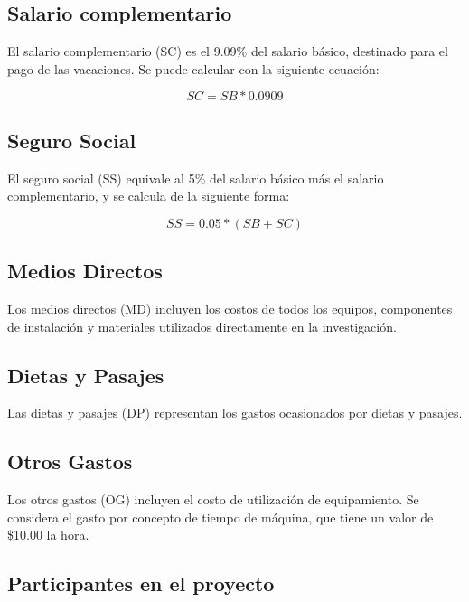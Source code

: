 \subsection{Salario complementario}

El salario complementario (SC) es el 9.09\% del salario básico, destinado para el pago de las vacaciones. Se puede calcular con la siguiente ecuación:

\begin{equation}
    \label{eq:salary_complementary}
    SC = SB * 0.0909
\end{equation}

\subsection{Seguro Social}

El seguro social (SS) equivale al 5\% del salario básico más el salario complementario, y se calcula de la siguiente forma:

\begin{equation}
    \label{eq:social_security}
    SS = 0.05 * (SB + SC)
\end{equation}

\subsection{Medios Directos}

Los medios directos (MD) incluyen los costos de todos los equipos, componentes de instalación y materiales utilizados directamente en la investigación.

\subsection{Dietas y Pasajes}

Las dietas y pasajes (DP) representan los gastos ocasionados por dietas y pasajes.

\subsection{Otros Gastos}

Los otros gastos (OG) incluyen el costo de utilización de equipamiento. Se considera el gasto por concepto de tiempo de máquina, que tiene un valor de \$10.00 la hora.

\subsection{Participantes en el proyecto}

